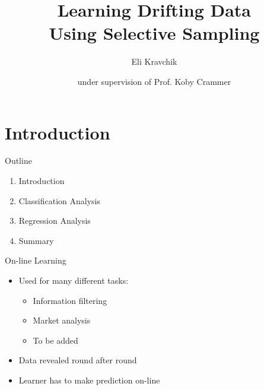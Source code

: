 \documentclass{beamer}
\title{Learning Drifting Data \\Using Selective Sampling}    %
\author {Eli Kravchik \and \newline\newline  under supervision of Prof. Koby Crammer\newline\newline
}
\institute{Faculty of Electrical Engineering, Technion\\
Israel Institute of Technology}
\begin{document}
\maketitle
\section{Introduction}

\begin{frame}{Outline}
\begin{enumerate}
\item Introduction\newline
\item Classification Analysis\newline
\item Regression Analysis\newline
\item Summary
\end{enumerate}
\end{frame}


\begin{frame}{On-line Learning}
\begin{itemize}
\item Used for many different tasks:\newline
\begin{itemize}
\item Information filtering\newline
\item Market analysis\newline
\item To be added\newline
\end{itemize}
\item Data revealed round after round\newline
\item Learner has to make prediction on-line
\end{itemize}
\end{frame}
\end{document}
